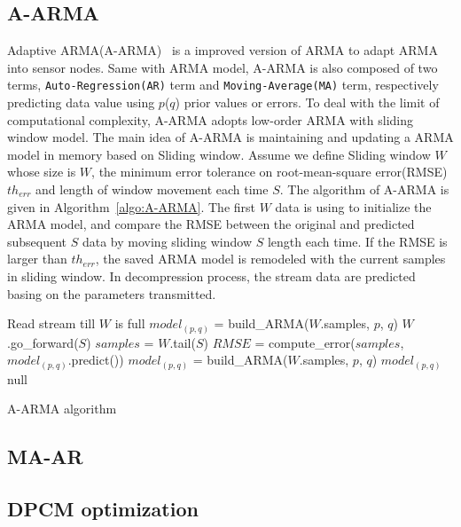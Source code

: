 \subsection{A-ARMA}
Adaptive ARMA(A-ARMA)~\cite{lu2010optimized} is a improved version of ARMA to
adapt ARMA into sensor nodes. Same with ARMA model, A-ARMA is also composed of
two terms, \texttt{Auto-Regression(AR)} term and \texttt{Moving-Average(MA)}
term, respectively predicting data value using $p$($q$) prior values or errors.
To deal with the limit of computational complexity, A-ARMA adopts low-order ARMA
with sliding window model. The main idea of A-ARMA is maintaining and updating a
ARMA model in memory based on Sliding window. Assume we define Sliding window
$W$ whose size is $W$, the minimum error tolerance on root-mean-square
error(RMSE) $th_{err}$ and length of window movement each time $S$. The
algorithm of A-ARMA is given in Algorithm~\ref{algo:A-ARMA}. The first $W$ data
is using to initialize the ARMA model, and compare the RMSE between the original
and predicted subsequent $S$ data by moving sliding window $S$ length each time.
If the RMSE is larger than $th_{err}$, the saved ARMA model is remodeled with
the current samples in sliding window. In decompression process, the stream data
are predicted basing on the parameters transmitted.

\begin{algorithm}
\begin{algorithmic}[1]
\Input
\EndInput
\Output
\EndOutput

\State Read stream till $W$ is full 
\State $model_{(p, q)}$ = build\_ARMA($W$.samples, $p$, $q$)  
    \State $W$.go\_forward($S$) 
    \State $samples$ = $W$.tail($S$)    
    \State $RMSE$ = compute\_error($samples$,  $model_{(p, q)}$.predict())
        \State $model_{(p, q)}$ = build\_ARMA($W$.samples, $p$, $q$)
        \State \Return $model_{(p, q)}$ 
    \Else
        \State \Return null 
    \EndIf
\EndWhile
\end{algorithmic}
\caption{A-ARMA algorithm}
\label{algo:A-ARMA}
\end{algorithm}

\subsection{MA-AR}

\subsection{DPCM optimization}

